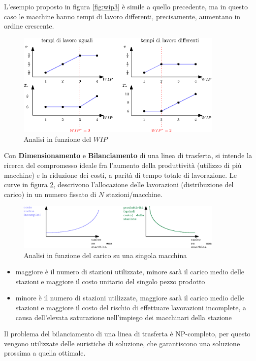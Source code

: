 \documentclass[10pt, letterpaper]{report}
\begin{document}
L'esempio proposto in figura \ref{fig:wip3} è simile a quello precedente, ma in questo caso le macchine hanno tempi 
di lavoro differenti, precisamente, aumentano in ordine crescente. 
\begin{center}
    \begin{figure}[h!]
        \centering
        \includegraphics[width=0.9\textwidth ]{images/analisiWIP.eps}
        \caption{Analisi in funzione del $WIP$}
        \label{fig:wipAnalysis}
    \end{figure}
\end{center}
Con \textbf{Dimensionamento} e \textbf{Bilanciamento} di una linea di trasferta, si intende la ricerca del 
compromesso ideale fra l'aumento della produttività (utilizzo di più macchine) e la riduzione dei costi, 
a parità di tempo totale di lavorazione. Le curve in figura \ref{fig:carico}, descrivono l'allocazione delle 
lavorazioni (distribuzione del carico) in un numero fissato di $N$ stazioni/macchine.
\begin{figure}[h!]
    \centering
    \includegraphics[width=0.9\textwidth ]{images/carico.eps}
    \caption{Analisi in funzione del carico su una singola macchina}
    \label{fig:carico}
\end{figure}
\begin{itemize}
    \item maggiore è il numero di stazioni utilizzate, minore sarà il carico medio delle
    stazioni e maggiore il costo unitario del singolo pezzo prodotto
    \item minore è il numero di stazioni utilizzate, maggiore sarà il carico medio delle
    stazioni e maggiore il costo del rischio di effettuare lavorazioni incomplete, 
    a causa dell'elevata saturazione nell'impiego dei macchinari della stazione
\end{itemize}
Il problema del bilanciamento di una linea di trasferta è NP-completo, per questo vengono utilizzate 
delle euristiche di soluzione, che garantiscono una soluzione prossima a quella ottimale. \acc 
\end{document}
